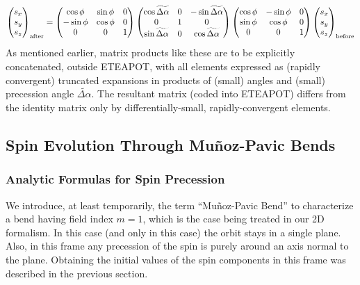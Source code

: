 \documentclass[]{article}
\begin{document}
\begin{equation}
\begin{pmatrix} s_x \\ s_y \\ s_z \end{pmatrix}_{\rm after}
 =
\begin{pmatrix} 
 \cos\phi  &  \sin\phi  &  0 \\
-\sin\phi  &  \cos\phi  &  0 \\
    0      &     0      &  1
\end{pmatrix}
\begin{pmatrix} 
 \cos\widetilde{\Delta\alpha}  &  0  & -\sin\widetilde{\Delta\alpha}  \\
           0                   &  1  &              0                 \\
 \sin\widetilde{\Delta\alpha}  &  0  &  \cos\widetilde{\Delta\alpha}  
\end{pmatrix}
\begin{pmatrix} 
 \cos\phi  & -\sin\phi  &  0 \\
 \sin\phi  &  \cos\phi  &  0 \\
    0      &     0      &  1
\end{pmatrix}
\begin{pmatrix} s_x \\ s_y \\ s_z \end{pmatrix}_{\rm before}
\label{eq:SpinPrecess.0q}
\end{equation}
%
As mentioned earlier, matrix products like these are to be 
explicitly concatenated, outside ETEAPOT, 
with all elements expressed as (rapidly convergent) truncated
expansions in products of (small) angles and 
(small) precession angle $\widetilde{\Delta\alpha}$. 
The resultant matrix (coded into ETEAPOT) differs from the 
identity matrix only by differentially-small, 
rapidly-convergent elements.

\subsection{Spin Evolution Through Mu\~noz-Pavic Bends}
\subsubsection{Analytic Formulas for Spin Precession}
We introduce, at least temporarily, the term 
``Mu\~noz-Pavic Bend'' to characterize a bend
having field index $m=1$, which is the case being treated in our
2D formalism. In this case (and only in this case)
the orbit stays in a single plane. Also,
in this frame any precession of the spin is purely around an 
axis normal to the plane. Obtaining the initial values of the
spin components in this frame was described in the previous section. 
\end{document}
